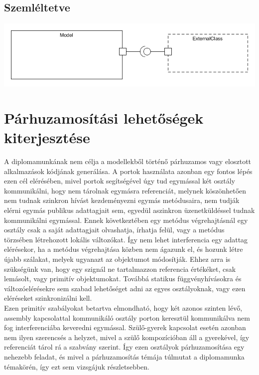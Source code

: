 \documentclass[a4paper,12pt]{report}
\begin{document}
\subsection{Szemléltetve}
\includegraphics[scale=0.6]{external_with_ports.png} \\


\section{Párhuzamosítási lehetőségek kiterjesztése}
A diplomamunkának nem célja a modellekből történő párhuzamos vagy elosztott alkalmazások kódjának generálása. A portok használata azonban egy fontos lépés ezen cél elérésében, mivel portok segítségével úgy tud egymással két osztály kommunikálni, hogy nem tárolnak egymásra referenciát, melynek köszönhetően nem tudnak szinkron hívást kezdeményezni egymás metódusaira, nem tudják elérni egymás publikus adattagjait sem, egyedül aszinkron üzenetküldéssel tudnak kommunikálni egymással. Ennek következtében egy metódus végrehajtásnál egy osztály csak a saját adattagjait olvashatja, írhatja felül, vagy a metódus törzsében létrehozott lokális változókat. Így nem lehet interferencia egy adattag elérésekor, ha a metódus végrehajtása közben nem ágazunk el, és hozunk létre újabb szálakat, melyek ugyanazt az objektumot módosítják. Ehhez arra is szükségünk van, hogy egy szignál ne tartalmazzon referencia értékéket, csak lemásolt, vagy primitív objektumokat. Továbbá statikus függvényhívásokra és változóelérésekre sem szabad lehetőséget adni az egyes osztályoknak, vagy ezen eléréseket szinkronizálni kell. \\

Ezen primitív szabályokat betartva elmondható, hogy két azonos szinten lévő, assembly kapcsolattal kommunikáló osztály porton keresztül kommunikálva nem fog interferenciába keveredni egymással. Szülő-gyerek kapcsolat esetén azonban nem ilyen szerencsés a helyzet, mivel a szülő kompozícióban áll a gyerekével, így referenciát tárol rá a szabvány szerint. Így ezen osztályok párhuzamosítása egy nehezebb feladat, és mivel a párhuzamosítás témája túlmutat a diplomamunka témakörén, így ezt sem vizsgájuk részletsebben.
\end{document}
